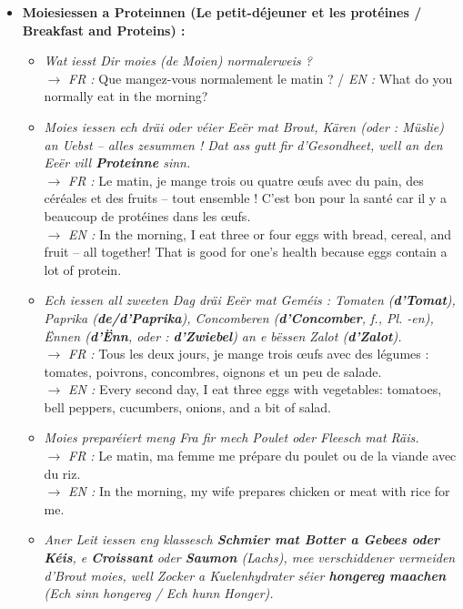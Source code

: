 \begin{itemize}
    \vspace{0.4em}

    \item \textbf{Moiesiessen a Proteinnen (Le petit-déjeuner et les protéines / Breakfast and Proteins) :}
    \begin{itemize}
        \item \textit{Wat iesst Dir moies (de Moien) normalerweis ?} \\
        $\rightarrow$ \textit{FR :} Que mangez-vous normalement le matin ? / \textit{EN :} What do you normally eat in the morning?
        \item \textit{Moies iessen ech dräi oder véier Eeër mat Brout, Kären (oder : Müslie) an Uebst -- alles zesummen ! Dat ass gutt fir d'Gesondheet, well an den Eeër vill \textbf{Proteinne} sinn.} \\
        $\rightarrow$ \textit{FR :} Le matin, je mange trois ou quatre œufs avec du pain, des céréales et des fruits -- tout ensemble ! C'est bon pour la santé car il y a beaucoup de protéines dans les œufs. \\
        $\rightarrow$ \textit{EN :} In the morning, I eat three or four eggs with bread, cereal, and fruit -- all together! That is good for one's health because eggs contain a lot of protein.
        \item \textit{Ech iessen all zweeten Dag dräi Eeër mat Geméis : Tomaten (\textbf{d'Tomat}), Paprika (\textbf{de/d'Paprika}), Concomberen (\textbf{d'Concomber}, f., Pl. \textit{-en}), Ënnen (\textbf{d'Ënn}, oder : \textbf{d'Zwiebel}) an e bëssen Zalot (\textbf{d'Zalot}).} \\
        $\rightarrow$ \textit{FR :} Tous les deux jours, je mange trois œufs avec des légumes : tomates, poivrons, concombres, oignons et un peu de salade. \\
        $\rightarrow$ \textit{EN :} Every second day, I eat three eggs with vegetables: tomatoes, bell peppers, cucumbers, onions, and a bit of salad.
        \item \textit{Moies preparéiert meng Fra fir mech Poulet oder Fleesch mat Räis.} \\
        $\rightarrow$ \textit{FR :} Le matin, ma femme me prépare du poulet ou de la viande avec du riz. \\
        $\rightarrow$ \textit{EN :} In the morning, my wife prepares chicken or meat with rice for me.
        \item \textit{Aner Leit iessen eng klassesch \textbf{Schmier mat Botter a Gebees oder Kéis}, e \textbf{Croissant} oder \textbf{Saumon} (Lachs), mee verschiddener vermeiden d'Brout moies, well Zocker a Kuelenhydrater séier \textbf{hongereg maachen} (\textit{Ech sinn hongereg} / \textit{Ech hunn Honger}).} \\

\end{itemize}
\end{itemize}
